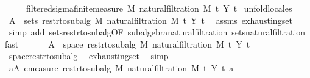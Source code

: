 \begin{isabellebody}
\ \ \ \ \ {\isachardoublequoteopen}filtered{\isacharunderscore}{\kern0pt}sigma{\isacharunderscore}{\kern0pt}finite{\isacharunderscore}{\kern0pt}measure\ M\ {\isacharparenleft}{\kern0pt}natural{\isacharunderscore}{\kern0pt}filtration\ M\ t\ Y{\isacharparenright}{\kern0pt}\ t\isanewline
%
\isadelimproof
%
\endisadelimproof
%
\isatagproof
{}\isamarkupfalse%
\ {\isacharparenleft}{\kern0pt}unfold{\isacharunderscore}{\kern0pt}locales{\isacharparenright}{\kern0pt}\isanewline
\ \ \isamarkupfalse%
\ {\isachardoublequoteopen}A\ {\isasymsubseteq}\ sets\ {\isacharparenleft}{\kern0pt}restr{\isacharunderscore}{\kern0pt}to{\isacharunderscore}{\kern0pt}subalg\ M\ {\isacharparenleft}{\kern0pt}natural{\isacharunderscore}{\kern0pt}filtration\ M\ t\ Y\ t\ \isamarkupfalse%
\ assms{\isacharparenleft}{\kern0pt}{}{\isacharparenright}{\kern0pt}\ exhausting{\isacharunderscore}{\kern0pt}set\ \isamarkupfalse%
\ {\isacharparenleft}{\kern0pt}simp\ add{\isacharcolon}{\kern0pt}\ sets{\isacharunderscore}{\kern0pt}restr{\isacharunderscore}{\kern0pt}to{\isacharunderscore}{\kern0pt}subalg{\isacharbrackleft}{\kern0pt}OF\ subalgebra{\isacharunderscore}{\kern0pt}natural{\isacharunderscore}{\kern0pt}filtration{\isacharbrackright}{\kern0pt}\ sets{\isacharunderscore}{\kern0pt}natural{\isacharunderscore}{\kern0pt}filtration{\isacharprime}{\kern0pt}{\isacharparenright}{\kern0pt}\ fast\isanewline
\ \ \isamarkupfalse%
\ \isamarkupfalse%
\ {\isachardoublequoteopen}{\isasymUnion}\ A\ {\isacharequal}{\kern0pt}\ space\ {\isacharparenleft}{\kern0pt}restr{\isacharunderscore}{\kern0pt}to{\isacharunderscore}{\kern0pt}subalg\ M\ {\isacharparenleft}{\kern0pt}natural{\isacharunderscore}{\kern0pt}filtration\ M\ t\ Y\ t\ \isamarkupfalse%
\ space{\isacharunderscore}{\kern0pt}restr{\isacharunderscore}{\kern0pt}to{\isacharunderscore}{\kern0pt}subalg\ \isamarkupfalse%
\ exhausting{\isacharunderscore}{\kern0pt}set\ \isamarkupfalse%
\ simp\isanewline
\ \ \isamarkupfalse%
\ \isamarkupfalse%
\ {\isachardoublequoteopen}{\isasymforall}a{\isasymin}A{\isachardot}{\kern0pt}\ emeasure\ {\isacharparenleft}{\kern0pt}restr{\isacharunderscore}{\kern0pt}to{\isacharunderscore}{\kern0pt}subalg\ M\ {\isacharparenleft}{\kern0pt}natural{\isacharunderscore}{\kern0pt}filtration\ M\ t\ Y\ t\ a\ {\isasymnoteq}\ {\isasyminfinity}{\isachardoublequoteclose}\ \isamarkupfalse%

\end{isabellebody}
